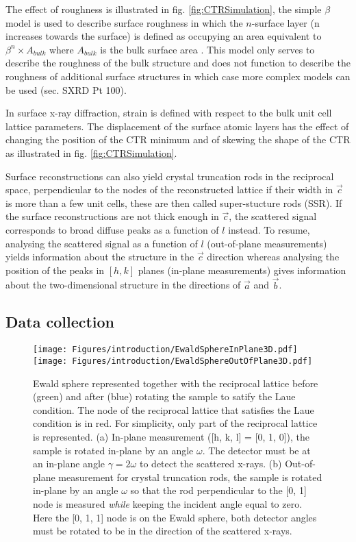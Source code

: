 The effect of roughness is illustrated in fig. \ref{fig:CTRSimulation}, the simple $\beta$ model is used to describe surface roughness in which the $n$-surface layer (n increases towards the surface) is defined as occupying an area equivalent to $\beta^n \times A_{bulk}$ where $A_{bulk}$ is the bulk surface area \parencite{Robinson1986}.
This model only serves to describe the roughness of the bulk structure and does not function to describe the roughness of additional surface structures in which case more complex models can be used (sec. SXRD Pt 100).

In surface x-ray diffraction, strain is defined with respect to the bulk unit cell lattice parameters.
The displacement of the surface atomic layers has the effect of changing the position of the CTR minimum and of skewing the shape of the CTR as illustrated in fig. \ref{fig:CTRSimulation}.

Surface reconstructions can also yield crystal truncation rods in the reciprocal space, perpendicular to the nodes of the reconstructed lattice if their width in $\vec{c}$ is more than a few unit cells, these are then called super-stucture rods (SSR).
If the surface reconstructions are not thick enough in $\vec{c}$, the scattered signal corresponds to broad diffuse peaks as a function of $l$ instead.
To resume, analysing the scattered signal as a function of $l$ (out-of-plane measurements) yields information about the structure in the $\vec{c}$ direction whereas analysing the position of the peaks in $[h, k]$ planes (in-plane measurements) gives information about the two-dimensional structure in the directions of $\vec{a}$ and $\vec{b}$.

\subsection{Data collection}

\begin{figure}[!htb]
    \centering
    \texttt{[image: Figures/introduction/EwaldSphereInPlane3D.pdf]}
    \texttt{[image: Figures/introduction/EwaldSphereOutOfPlane3D.pdf]}
    \caption{
    Ewald sphere represented together with the reciprocal lattice before (green) and after (blue) rotating the sample to satify the Laue condition. The node of the reciprocal lattice that satisfies the Laue condition is in red.
    For simplicity, only part of the reciprocal lattice is represented.
    (a) In-plane measurement ([h, k, l] = [0, 1, 0]), the sample is rotated in-plane by an angle $\omega$.
    The detector must be at an in-plane angle $\gamma=2\omega$ to detect the scattered x-rays.
    (b) Out-of-plane measurement for crystal truncation rods, the sample is rotated in-plane by an angle $\omega$ so that the rod perpendicular to the [0, 1] node is measured \textit{while} keeping the incident angle equal to zero.
    Here the [0, 1, 1] node is on the Ewald sphere, both detector angles must be rotated to be in the direction of the scattered x-rays.
    }
    \label{fig:EwaldSphere}
\end{figure}

